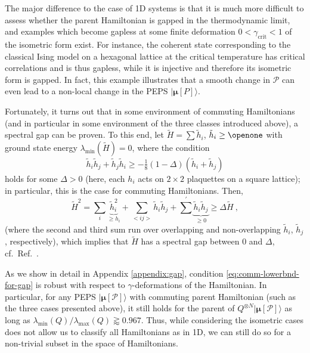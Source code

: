 \documentclass[twocolumn,superscriptaddress,prb,linenumbers]{revtex4-1}
\newcommand{\MPS}[1]{| {\bm\mu}[#1]\rangle}
\newcommand{\mc}[1]{\mathcal{#1}}
\begin{document}
The major difference to the case of 1D systems is that it is much more
difficult to assess whether the parent Hamiltonian is gapped in the
thermodynamic limit, and examples which become gapless at some finite
deformation $0<\gamma_\mathrm{crit}<1$ of the isometric form exist. For
instance, the coherent state corresponding to the classical Ising
model\cite{verstraete:comp-power-of-peps} on a hexagonal lattice at the
critical temperature has critical correlations and is thus
gapless,\cite{hastings:gap-and-expdecay} while it is injective and
therefore
its isometric form is gapped.  In fact, this example illustrates that a
smooth change in $\mc P$ can even lead to a non-local change in the PEPS
$\MPS{P}$.


Fortunately, it turns out that in some environment of commuting
Hamiltonians (and in particular in some environment of the three classes
introduced above), a spectral gap can be proven.  To this end,
let $\tilde H=\sum \tilde h_i$, $\tilde h_i\ge\openone$ with ground state
energy $\lambda_{\min}(\tilde H)=0$, where the condition
\begin{equation}
    \label{eq:comm-lowerbnd-for-gap}
    \tilde h_i \tilde h_j+\tilde h_j \tilde h_i
    \ge -\tfrac18(1-\Delta) (\tilde h_i+\tilde h_j)
\end{equation}
holds for some $\Delta>0$ (here, each $h_i$ acts on $2\times2$ plaquettes
on a square lattice); in particular, this is the case for commuting
Hamiltonians. Then,
\begin{equation}
    \label{eq:comm-gap-simple}
    \tilde H^2=
    \sum_i \underbrace{\tilde h_i^2}_{\ge h_i} +
    \sum_{<ij>} \tilde h_i \tilde h_j +
    {\sum}^\prime \underbrace{\tilde h_i \tilde h_j}_{\ge0}
    \ge \Delta \tilde H
    \ ,
\end{equation}
(where the second and third sum run over overlapping and non-overlapping
$\tilde h_i$, $\tilde h_j$, respectively), which implies that $\tilde H$
has a spectral gap between $0$ and $\Delta$, cf.~Ref.~.

As we show in detail in Appendix \ref{appendix:gap}, condition
\eqref{eq:comm-lowerbnd-for-gap} is robust with respect to
$\gamma$-deformations of the Hamiltonian.  In
particular, for any PEPS $\MPS{\mc P}$ with commuting parent Hamiltonian
(such as the three cases presented above), it still holds for the parent
of $Q^{\otimes N}\MPS{\mc P}$ as long as
$\lambda_{\min{}}(Q)/\lambda_{\max{}}(Q)\gtrapprox 0.967$. Thus, while
considering the isometric cases does not allow us to classify all
Hamiltonians as in 1D, we can still do so for a non-trivial subset in the
space of Hamiltonians.
\end{document}
